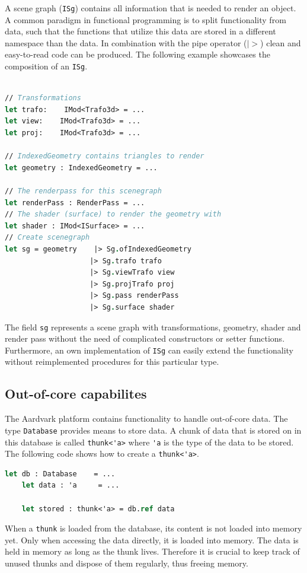 A scene graph (\verb|ISg|) contains all information that is needed to render an object. A common paradigm in functional programming is to split functionality from data, such that the functions that utilize this data are stored in a different namespace than the data. In combination with the pipe operator ($|>$) clean and easy-to-read code can be produced. The following example showcases the composition of an \verb|ISg|. 

\begin{lstlisting}[language = FSharp]

// Transformations
let trafo:    IMod<Trafo3d> = ... 
let view:    IMod<Trafo3d> = ...
let proj:    IMod<Trafo3d> = ...

// IndexedGeometry contains triangles to render
let geometry : IndexedGeometry = ...

// The renderpass for this scenegraph
let renderPass : RenderPass = ...
// The shader (surface) to render the geometry with
let shader : IMod<ISurface> = ...
// Create scenegraph
let sg = geometry    |> Sg.ofIndexedGeometry
                    |> Sg.trafo trafo
                    |> Sg.viewTrafo view
                    |> Sg.projTrafo proj
                    |> Sg.pass renderPass
                    |> Sg.surface shader
\end{lstlisting}

The field \verb|sg| represents a scene graph with transformations, geometry, shader and render pass without the need of complicated constructors or setter functions. Furthermore, an own implementation of \verb|ISg| can easily extend the functionality without reimplemented procedures for this particular type. 


\subsection{Out-of-core capabilites}

The Aardvark platform contains functionality to handle out-of-core data. The type \verb|Database| provides means to store data. A chunk of data that is stored on in this database is called \verb|thunk<'a>| where \verb|'a| is the type of the data to be stored. The following code shows how to create a \verb|thunk<'a>|. 

\begin{lstlisting}[language = FSharp]
    let db : Database    = ...
    let data : 'a     = ...
    
    let stored : thunk<'a> = db.ref data
\end{lstlisting}
When a \verb|thunk| is loaded from the database, its content is not loaded into memory yet. Only when accessing the data directly, it is loaded into memory. The data is held in memory as long as the thunk lives. Therefore it is crucial to keep track of unused thunks and dispose of them regularly, thus freeing memory. 


